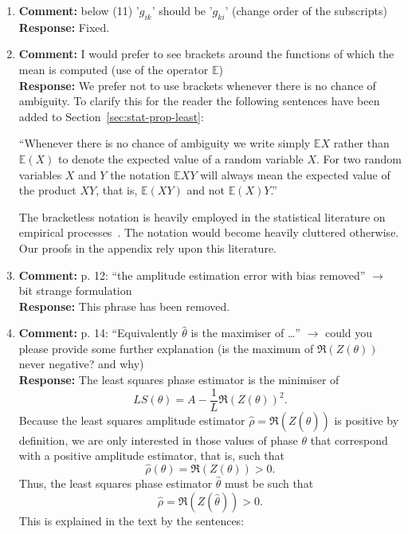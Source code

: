 \documentclass{article}
\newcommand{\expect}{{\mathbb E}}
\begin{document}
\begin{enumerate}
\item \textbf{Comment:} below (11) '$g_{ik}$' should be '$g_{ki}$' (change order of the subscripts) \\
\textbf{Response:} Fixed.

\item \label{rev2:commentE} \textbf{Comment:} I would prefer to see brackets around the functions of which the mean is computed (use of the operator $\mathbb E$) \\
\textbf{Response:} We prefer not to use brackets whenever there is no chance of ambiguity.  To clarify this for the reader the following sentences have been added to Section~\ref{sec:stat-prop-least}:

``Whenever there is no chance of ambiguity we write simply $\expect X$ rather than $\expect(X)$ to denote the expected value of a random variable $X$.  For two random variables $X$ and $Y$ the notation $\expect X Y$ will always mean the expected value of the product $XY$, that is, $\expect(XY)$ and not $\expect(X)Y$.''

The bracketless notation is heavily employed in the statistical literature on empirical processes~\cite{Pollard_new_ways_clts_1986,Pollard_conv_stat_proc_1984,Pollard_asymp_empi_proc_1989,van2009empirical}. The notation would become heavily cluttered otherwise.  Our proofs in the appendix rely upon this literature.

\item \textbf{Comment:} p. 12: ``the amplitude estimation error with bias removed'' $\to$ bit strange formulation \\
\textbf{Response:} This phrase has been removed.

\item \textbf{Comment:} p. 14: ``Equivalently $\hat\theta$ is the maximiser of \dots'' $\to$ could you please provide some further explanation (is the maximum of $\Re(Z(\theta))$ never negative? and why) \\
\textbf{Response:} The least squares phase estimator is the minimiser of
\[
LS(\theta) = A - \frac{1}{L}\Re(Z(\theta))^2.
\]
Because the least squares amplitude estimator $\hat{\rho} = \Re(Z(\hat{\theta}))$ is positive by definition, we are only interested in those values of phase $\theta$ that correspond with a positive amplitude estimator, that is, such that
\[
\hat{\rho}(\theta) = \Re(Z(\theta)) > 0.
\]
Thus, the least squares phase estimator $\hat{\theta}$ must be such that
\[
\hat{\rho} = \Re(Z(\hat{\theta})) > 0.
\]
This is explained in the text by the sentences:


\end{enumerate}
\end{document}
